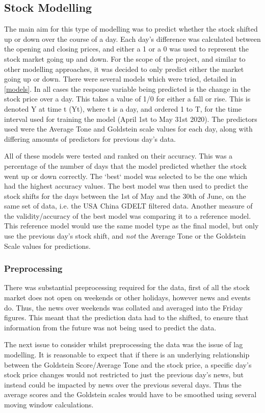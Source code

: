 \subsection{Stock Modelling}
The main aim for this type of modelling was to predict whether the stock shifted up or down over the course of a day. Each day's difference was calculated between the opening and closing prices, and either a 1 or a 0 was used to represent the stock market going up and down. For the scope of the project, and similar to other modelling approaches, it was decided to only predict either the market going up or down. There were several models which were tried, detailed in \ref{models}. In all cases the response variable being predicted is the change in the stock price over a day. This takes a value of 1/0 for either a fall or rise. This is denoted Y at time t (Yt), where t is a day, and ordered 1 to T, for the time interval used for training the model (April 1st to May 31st 2020). The predictors used were the Average Tone and Goldstein scale values for each day, along with differing amounts of predictors for previous day's data.

All of these models were tested and ranked on their accuracy. This was a percentage of the number of days that the model predicted whether the stock went up or down correctly. The `best` model was selected to be the one which had the highest accuracy values. The best model was then used to predict the stock shifts for the days between the 1st of May and the 30th of June, on the same set of data, i.e. the USA China GDELT filtered data. Another measure of the validity/accuracy of the best model was comparing it to a reference model. This reference model would use the same model type as the final model, but only use the previous day's stock shift, and \textit{not} the Average Tone or the Goldstein Scale values for predictions. 

\subsubsection{Preprocessing}
There was substantial preprocessing required for the data, first of all the stock market does not open on weekends or other holidays, however news and events do. Thus, the news over weekends was collated and averaged into the Friday figures. This meant that the prediction data had to the shifted, to ensure that information from the future was not being used to predict the data.

The next issue to consider whilst preprocessing the data was the issue of lag modelling. It is reasonable to expect that if there is an underlying relationship between the Goldstein Score/Average Tone and the stock price, a specific day's stock price changes would not restricted to just the previous day's news, but instead could be impacted by news over the previous several days. Thus the average scores and the Goldstein scales would have to be smoothed using several moving window calculations.

